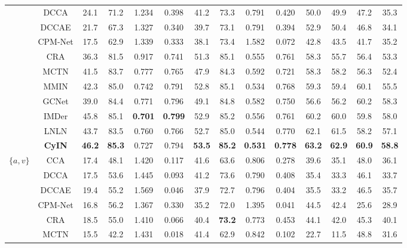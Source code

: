 \documentclass{article}
\begin{document}
\begin{table}[htbp]
{\begin{tabular}{cccccccccccccc}
        ~ & DCCA & 24.1  & 71.2  & 1.234  & 0.398  & 41.2  & 73.3  & 0.791  & 0.420  & 50.0  & 49.9  & 47.2  & 35.3  \\ 
        ~ & DCCAE & 21.7  & 67.3  & 1.327  & 0.340  & 39.7  & 73.1  & 0.791  & 0.394  & 52.9  & 50.4  & 46.8  & 34.1  \\ 
        ~ & CPM-Net & 17.5  & 62.9  & 1.339  & 0.333  & 38.1  & 73.4  & 1.582  & 0.072  & 42.8  & 43.5  & 41.7  & 35.2  \\ 
        ~ & CRA & 36.3  & 81.5  & 0.917  & 0.741  & 51.3  & 85.1  & 0.555  & 0.761  & 58.3  & 55.7  & 56.4  & 53.3  \\ 
        ~ & MCTN & 41.5  & 83.7  & 0.777  & 0.765  & 47.9  & 84.3  & 0.592  & 0.721  & 58.3  & 58.2  & 56.3  & 52.4  \\ 
        ~ & MMIN & 42.3  & 85.0  & 0.742  & 0.791  & 52.8  & 85.1  & 0.534  & 0.768  & 59.3  & 59.4  & 60.1  & 55.5 \\ 
        ~ & GCNet & 39.0  & 84.4  & 0.771  & 0.796  & 49.1  & 84.8  & 0.582  & 0.750  & 56.6  & 56.2  & 60.2  & 58.3  \\ 
        ~ & IMDer & 45.8  & 85.1  & \textbf{0.701}  & \textbf{0.799}  & 52.9  & 85.2  & 0.556  & 0.761  & 60.2  & 60.0  & 59.8  & 58.0 \\ 
        ~ & LNLN & 43.7  & 83.5  & 0.760  & 0.766  & 52.7  & 85.0  & 0.544  & 0.770  & 62.1  & 61.5  & 58.2  & 57.1  \\ 
    & \textbf{CyIN}  & \textbf{46.2} & \textbf{85.3} & 0.727 & 0.794 & \textbf{53.5} & \textbf{85.2} & \textbf{0.531} & \textbf{0.778} & \textbf{63.2} & \textbf{62.9} & \textbf{60.9} & \textbf{58.8} \\ 
    \midrule[0.5pt]
    \multirow{11}{*}{$\{a,v\}$}  ~ & CCA & 17.4  & 48.1  & 1.420  & 0.117  & 41.6  & 63.6  & 0.806  & 0.278  & 39.6  & 35.1  & 48.0  & 36.1  \\ 
        ~ & DCCA & 17.5  & 53.6  & 1.445  & 0.093  & 41.2  & 73.6  & 0.790  & 0.408  & 35.4  & 33.3  & 46.1  & 33.7  \\ 
        ~ & DCCAE & 19.4  & 55.2  & 1.569  & 0.046  & 37.9  & 72.7  & 0.796  & 0.404  & 35.5  & 33.2  & 46.5  & 35.7  \\ 
        ~ & CPM-Net & 16.8  & 56.2  & 1.367  & 0.330  & 35.2  & 72.0  & 1.395  & 0.041  & 44.5  & 42.4  & 25.6  & 28.9  \\ 
        ~ & CRA & 18.5  & 55.0  & 1.410  & 0.066  & 40.4  & \textbf{73.2}  & 0.773  & 0.453  & 44.1  & 42.0  & 45.3  & 40.1  \\ 
        ~ & MCTN & 15.5  & 42.2  & 1.431  & 0.018  & 41.4  & 62.9  & 0.842  & 0.102  & 22.7  & 11.5  & 48.8  & 31.6  \\ 

\end{tabular}}
\end{table}
\end{document}
